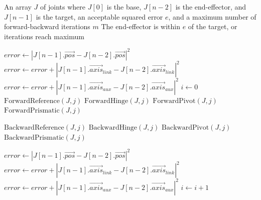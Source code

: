 \newpage
\begin{algorithm}[h!]
\caption{FABRIK Algorithm}
\label{alg:fabrik}
\normalsize{
\begin{algorithmic}[1]
    \Require An array $J$ of joints where $J[0]$ is the base, $J[n-2]$ is the end-effector, and $J[n-1]$ is the target, an acceptable squared error $e$, and a maximum number of forward-backward iterations $m$
    \Ensure The end-effector is within $e$ of the target, or iterations reach maximum
    
        \State $error\gets |J[n-1].\vec{pos}-J[n-2].\vec{pos}|^2$
        \State $error\gets error+|J[n-1].\vec{axis}_{link}-J[n-2].\vec{axis}_{link}|^2$
        \State $error\gets error+|J[n-1].\vec{axis}_{aux}-J[n-2].\vec{axis}_{aux}|^2$
        \State $i\gets 0$
                    \State $\text{ForwardReference}(J, j)$
                    \State $\text{ForwardHinge}(J, j)$
                    \State $\text{ForwardPivot}(J, j)$
                    \State $\text{ForwardPrismatic}(J, j)$
                \EndIf
            \EndFor
            \Statex

                    \State $\text{BackwardReference}(J, j)$
                    \State $\text{BackwardHinge}(J, j)$
                    \State $\text{BackwardPivot}(J, j)$
                    \State $\text{BackwardPrismatic}(J, j)$
                \EndIf
            \EndFor
            \Statex

            \State $error\gets |J[n-1].\vec{pos}-J[n-2].\vec{pos}|^2$
            \State $error\gets error+|J[n-1].\vec{axis}_{link}-J[n-2].\vec{axis}_{link}|^2$
            \State $error\gets error+|J[n-1].\vec{axis}_{aux}-J[n-2].\vec{axis}_{aux}|^2$
            \State $i\gets i+1$
        \EndWhile
    \EndFunction
\end{algorithmic}
}
\end{algorithm}


